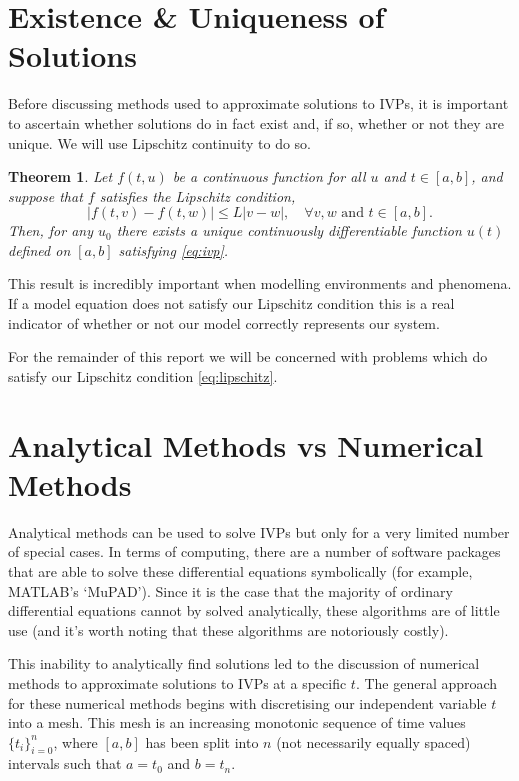 \documentclass[12pt, twoside]{report}
\theoremstyle{plain}
\newtheorem{theorem}{Theorem}[chapter]
\theoremstyle{definition}
\theoremstyle{definition}
\providecommand{\abs}[1]{\lvert#1\rvert}
\begin{document}
    \section{Existence \& Uniqueness of Solutions}
    \label{1_existence}
        Before discussing methods used to approximate solutions to IVPs, it is
        important to ascertain whether solutions do in fact exist and, if so,
        whether or not they are unique. We will use Lipschitz continuity to do
        so.
        \begin{theorem}
        \label{1_existence_uniqueness}
            Let $f(t,u)$ be a continuous function for all $u$ and $t \in 
            [a, b]$, and suppose that $f$ satisfies the Lipschitz condition,
            \begin{equation}
            \label{eq:lipschitz}
                \abs{f(t,v)-f(t,w)} \le L\abs{v-w},
                \quad \forall v, w \text{ and } t \in [a,b].
            \end{equation}
            Then, for any $u_0$ there exists a unique continuously
            differentiable function $u(t)$ defined on $[a,b]$ satisfying
            \eqref{eq:ivp}.
        \end{theorem}
        This result is incredibly important when modelling environments and 
        phenomena. If a model equation does not satisfy our Lipschitz condition
        this is a real indicator of whether or not our model correctly 
        represents our system.

        For the remainder of this report we will be concerned with problems 
        which do satisfy our Lipschitz condition \eqref{eq:lipschitz}.


    \section{Analytical Methods vs Numerical Methods}
    \label{1_analytical_numerical}
        Analytical methods can be used to solve IVPs but only for a very limited
        number of special cases. In terms of computing, there are a number of 
        software packages that are able to solve these differential equations
        symbolically (for example, MATLAB's `MuPAD'). Since it is the case that
        the majority of ordinary differential equations cannot by solved 
        analytically, these algorithms are of little use (and it's worth noting
        that these algorithms are notoriously costly).

        This inability to analytically find solutions led to the discussion of
        numerical methods to approximate solutions to IVPs at a specific $t$. 
        The general approach for these numerical methods begins with 
        discretising our independent variable $t$ into a mesh. This mesh is an 
        increasing monotonic sequence of time values ${\lbrace 
        t_i\rbrace}_{i=0}^n$, where $[a,b]$ has been split into $n$ (not 
        necessarily equally spaced) intervals such that $a=t_0$ and $b=t_n$.
\end{document}
